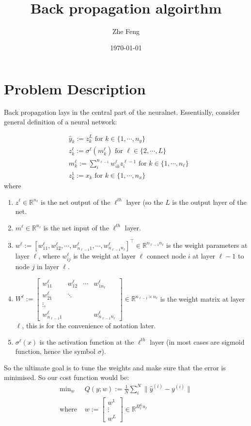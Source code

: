 \documentclass{article} [10pt] %
\title{Back propagation algoirthm}
\author{Zhe Feng}
\date{\today}
\begin{document}
\noindent
\maketitle
\section{Problem Description}	\label{sec:problem_ddescription}
Back propagation lays in the central part of the neuralnet. Essentially, consider general definition of a neural network:

\begin{align}
	&\hat{y}_k := z^L_k \text{ for } k \in \{1, \cdots, n_y\}\\
	&z^\ell_k := \sigma^\ell (m^\ell_k) \text{ for } \ell \in \{2, \cdots, L\} \\
	&m^\ell_k := \sum^{n_{\ell-1}}_i w^\ell_{ik}z^{\ell-1}_i \text{ for } k \in \{1, \cdots, n_{\ell}\} \label{eq:netin}\\ 
	&z^1_k := x_k \text{ for } k \in \{1, \cdots, n_x\}
\end{align}
where
\begin{enumerate}
	\item $z^\ell \in \mathbb{R}^{n_\ell}$ is the net output of the $\ell^{th}$ layer (so the $L$ is the output layer of the net.
	\item $m^\ell \in \mathbb{R}^{n_\ell}$ is the net input of the $\ell^{th}$ layer.
	\item $w^\ell := [w^\ell_{11}, w^\ell_{12}, \cdots,w^\ell_{n_{\ell-1}1}, \cdots,w^\ell_{n_{\ell-1}n_\ell}]^\top \in \mathbb{R}^{n_{\ell-1}n_\ell}$ is the weight parameters at layer $\ell$, where $w^\ell_{ij}$ is the weight at layer $\ell$ connect node $i$ at layer $\ell-1$ to node $j$ in layer $\ell$.
	\item $W^\ell := \begin{bmatrix}
				w_{11}^\ell &w_{12}^\ell &\cdots &w_{1n_\ell}^\ell\\
				w^\ell_{21} &\ddots \\
				\vdots,\\
				w^\ell_{n_{\ell-1}1} &&&w^\ell_{n_{\ell-1}n_\ell}
				\end{bmatrix} \in \mathbb{R}^{n_{\ell-1}\times n_\ell}$ is the weight matrix at layer $\ell$, this is for the convenience of notation later.
	\item $\sigma^\ell(x)$ is the activation function at the $\ell^{th}$ layer (in most cases are sigmoid function, hence the symbol $\sigma$).
\end{enumerate}
So the ultimate goal is to tune the weights and make sure that the error is minimised. So our cost function would be:
\begin{align}
	\text{min}_w &Q(y; w) := \frac{1}{N} \sum_i^N \| \hat{y}^{(i)} - y^{(i)} \| \\
	\text{where } &w := \begin{bmatrix}w^1\\ \vdots\\ w^L\end{bmatrix} \in \mathbb{R}^{\Pi_\ell^Ln_\ell}
\end{align}
\end{document}

